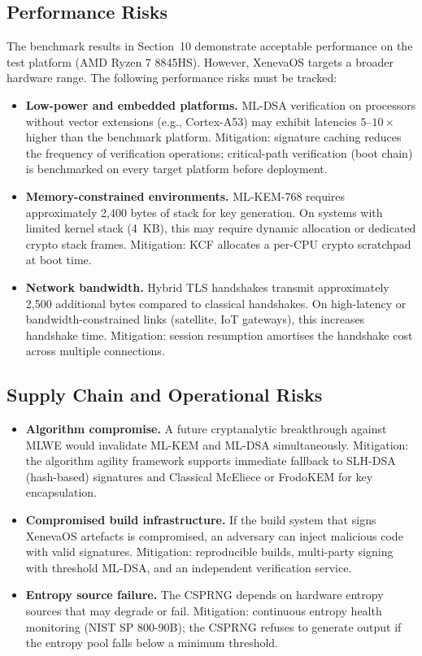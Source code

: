 \documentclass[11pt, a4paper]{article}
\begin{document}
\subsection{Performance Risks}\label{sec:perf-risks}

The benchmark results in Section~10 demonstrate acceptable performance on the test platform (AMD Ryzen 7 8845HS). However, XenevaOS targets a broader hardware range. The following performance risks must be tracked:

\begin{itemize}
    \item \textbf{Low-power and embedded platforms.} ML-DSA verification on processors without vector extensions (e.g., Cortex-A53) may exhibit latencies $5$--$10\times$ higher than the benchmark platform. Mitigation: signature caching reduces the frequency of verification operations; critical-path verification (boot chain) is benchmarked on every target platform before deployment.
    \item \textbf{Memory-constrained environments.} ML-KEM-768 requires approximately 2,400 bytes of stack for key generation. On systems with limited kernel stack (4~KB), this may require dynamic allocation or dedicated crypto stack frames. Mitigation: KCF allocates a per-CPU crypto scratchpad at boot time.
    \item \textbf{Network bandwidth.} Hybrid TLS handshakes transmit approximately 2,500 additional bytes compared to classical handshakes. On high-latency or bandwidth-constrained links (satellite, IoT gateways), this increases handshake time. Mitigation: session resumption amortises the handshake cost across multiple connections.
\end{itemize}

\subsection{Supply Chain and Operational Risks}\label{sec:supply-chain}

\begin{itemize}
    \item \textbf{Algorithm compromise.} A future cryptanalytic breakthrough against MLWE would invalidate ML-KEM and ML-DSA simultaneously. Mitigation: the algorithm agility framework supports immediate fallback to SLH-DSA (hash-based) signatures and Classical McEliece or FrodoKEM for key encapsulation.
    \item \textbf{Compromised build infrastructure.} If the build system that signs XenevaOS artefacts is compromised, an adversary can inject malicious code with valid signatures. Mitigation: reproducible builds, multi-party signing with threshold ML-DSA, and an independent verification service.
    \item \textbf{Entropy source failure.} The CSPRNG depends on hardware entropy sources that may degrade or fail. Mitigation: continuous entropy health monitoring (NIST SP 800-90B); the CSPRNG refuses to generate output if the entropy pool falls below a minimum threshold.
\end{itemize}
\end{document}
